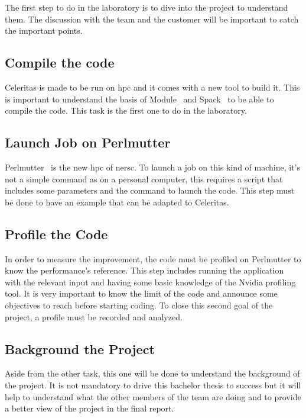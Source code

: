 The first step to do in the laboratory is to dive into the project to understand them.
The discussion with the team and the customer will be important to catch the important points.


\subsection{Compile the code}
\label{spec:ch:activities:understand-the-project:compile-the-code}

Celeritas is made to be run on \acrshort{hpc} and it comes with a new tool to build it.
This is important to understand the basis of Module~\cite{Module} and Spack~\cite{Spack} to be able to compile the code.
This task is the first one to do in the laboratory.


\subsection{Launch Job on Perlmutter}
\label{spec:ch:activities:understand-the-project:launch-job-on-perlmutter}
Perlmutter~\cite{Perlmutter} is the new \acrshort{hpc} of \acrshort{nersc}.
To launch a job on this kind of machine, it's not a simple command as on a personal computer, this requires a script that includes some parameters and the command to launch the code.
This step must be done to have an example that can be adapted to Celeritas.


\subsection{Profile the Code}
\label{specspec:ch:activities:understand-the-project:profile-the-code}

In order to measure the improvement, the code must be profiled on Perlmutter to know the performance's reference.
This step includes running the application with the relevant input and having some basic knowledge of the Nvidia profiling tool.
It is very important to know the limit of the code and announce some objectives to reach before starting coding.
To close this second goal of the project, a profile must be recorded and analyzed.


\subsection{Background the Project}
\label{spec:ch:activities:understand-the-project:background-the-project}

Aside from the other task, this one will be done to understand the background of the project.
It is not mandatory to drive this bachelor thesis to success but it will help to understand what the other members of the team are doing and to provide a better view of the project in the final report.



